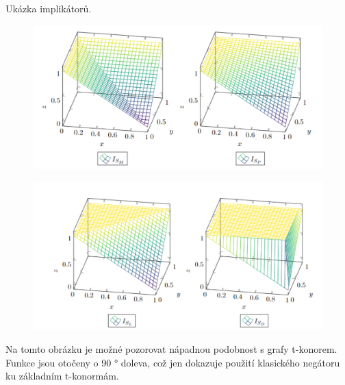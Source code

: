 \begin{graph} Uk\' azka implik\' ator\r u.
    \begin{figure}[H]
                \hspace{-1cm}
                \includegraphics[scale=0.65]{template-fig/impl1.pdf}
                \centering
            \end{figure}
            \begin{figure}[H]
                \hspace{-1cm}
                \includegraphics[scale=0.65]{template-fig/impl2.pdf}
                \centering
            \end{figure}

\end{graph}
Na tomto obrázku je možné pozorovat nápadnou podobnost s grafy t-konorem. Funkce jsou otočeny o 90 ° doleva, což jen dokazuje použití klasick\' eho negátoru ku základním t-konormám. 


